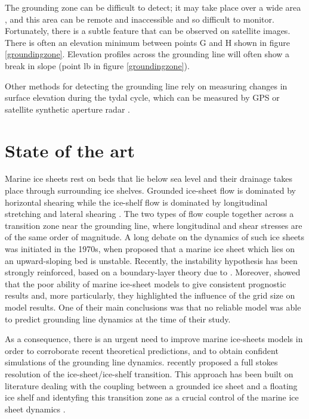 \documentclass[a4paper,12pt]{article}
\begin{document}
The grounding zone can be difficult to detect; it may take place over a wide area \cite[]{fricker2009mapping}, and this area can be remote and inaccessible and so difficult to monitor. Fortunately, there is a subtle feature that can be observed on satellite images. There is often an elevation minimum between points G and H shown in figure \ref{groundingzone}. Elevation profiles across the grounding line will often show a break in slope (point lb in figure \ref{groundingzone}). 

Other methods for detecting the grounding line rely on measuring changes in surface elevation during the tydal cycle, which can be measured by GPS or satellite synthetic aperture radar \cite[]{rignot2011antarctic,fricker2009mapping,brunt2010mapping}.

\section{State of the art}
Marine ice sheets rest on beds that lie below sea level and their drainage takes place through surrounding ice shelves. Grounded ice-sheet flow is dominated by horizontal shearing while the ice-shelf flow is dominated by longitudinal stretching and lateral shearing \cite[]{durand2009full}. The two types of flow couple together across a transition zone near the grounding line, where longitudinal and shear stresses are of the same order of magnitude. A long debate on the dynamics of such ice sheets was initiated in the 1970s, when \cite{weertman1974stability} proposed that a marine ice sheet which lies on an upward-sloping bed is unstable. Recently, the instability hypothesis has been strongly reinforced, based on a boundary-layer theory due to \cite{schoof2007ice}. Moreover, \cite{vieli2005assessing} showed that the poor ability of marine ice-sheet models to give consistent prognostic results and, more particularly, they highlighted the influence of the grid size on model results. One of their main conclusions was that no reliable model was able to predict grounding line dynamics at the time of their study.

As a consequence, there is an urgent need to improve marine ice-sheets models in order to corroborate recent theoretical predictions, and to obtain confident simulations of the grounding line dynamics. \cite{durand2009marine} recently proposed a full stokes resolution of the ice-sheet/ice-shelf transition. This approach has been built on literature dealing with the coupling between a grounded ice sheet and a floating ice shelf and identyfing this transition zone as a crucial control of the marine ice sheet dynamics \cite[]{weertman1974stability,van1985response,chugunov1996modelling,hindmarsh1996stability,vieli2005assessing,schoof2007ice,schoof2007marine}.
\end{document}
